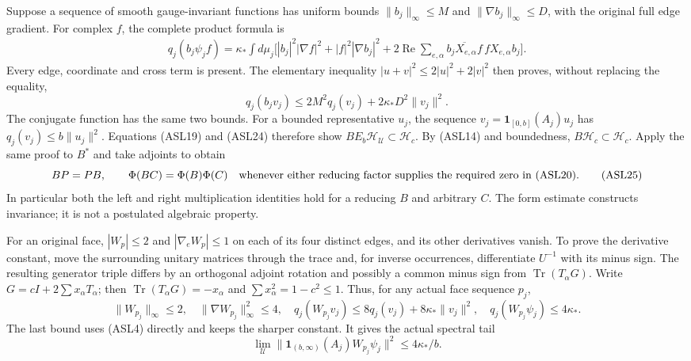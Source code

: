 \documentclass[11pt]{article}
\begin{document}
Suppose a sequence of smooth gauge-invariant functions has uniform bounds \(\|b_j\|_\infty\le M\) and \(\|\nabla b_j\|_\infty\le D\), with the original full edge gradient. For complex \(f\), the complete product formula is
\[
\begin{aligned}
 q_j(b_j\psi_jf)=\kappa_*\int d\mu_j\bigl[
 |b_j|^2|\nabla f|^2+|f|^2|\nabla b_j|^2
 +2\operatorname{Re}\sum_{e,\alpha}
    \overline{b_jX_{e,\alpha}f}\,fX_{e,\alpha}b_j\bigr].
\end{aligned}\tag{ASL23}
\]
Every edge, coordinate and cross term is present. The elementary inequality \(|u+v|^2\le2|u|^2+2|v|^2\) then proves, without replacing the equality,
\[
 q_j(b_jv_j)\le2M^2q_j(v_j)+2\kappa_*D^2\|v_j\|^2.
 \tag{ASL24}
\]
The conjugate function has the same two bounds. For a bounded representative \(u_j\), the sequence \(v_j=\mathbf1_{[0,b]}(A_j)u_j\) has \(q_j(v_j)\le b\|u_j\|^2\). Equations (ASL19) and (ASL24) therefore show \(BE_b\mathcal H_{\mathcal U}\subset\mathcal H_c\). By (ASL14) and boundedness, \(B\mathcal H_c\subset\mathcal H_c\). Apply the same proof to \(B^*\) and take adjoints to obtain
\[
 BP=PB,\qquad \Phi(BC)=\Phi(B)\Phi(C)
 \quad\hbox{whenever either reducing factor supplies the required zero in (ASL20).}
 \tag{ASL25}
\]
In particular both the left and right multiplication identities hold for a reducing \(B\) and arbitrary \(C\). The form estimate constructs invariance; it is not a postulated algebraic property.

For an original face, \(|W_p|\le2\) and \(|\nabla_eW_p|\le1\) on each of its four distinct edges, and its other derivatives vanish. To prove the derivative constant, move the surrounding unitary matrices through the trace and, for inverse occurrences, differentiate \(U^{-1}\) with its minus sign. The resulting generator triple differs by an orthogonal adjoint rotation and possibly a common minus sign from \(\operatorname{Tr}(T_\alpha G)\). Write \(G=cI+2\sum x_\alpha T_\alpha\); then \(\operatorname{Tr}(T_\alpha G)=-x_\alpha\) and \(\sum x_\alpha^2=1-c^2\le1\). Thus, for any actual face sequence \(p_j\),
\[
 \|W_{p_j}\|_\infty\le2,\quad
 \|\nabla W_{p_j}\|_\infty^2\le4,\quad
 q_j(W_{p_j}v_j)\le8q_j(v_j)+8\kappa_*\|v_j\|^2,
 \quad q_j(W_{p_j}\psi_j)\le4\kappa_*.
 \tag{ASL26}
\]
The last bound uses (ASL4) directly and keeps the sharper constant. It gives the actual spectral tail
\[
 \lim_{\mathcal U}\|\mathbf1_{(b,\infty)}(A_j)W_{p_j}\psi_j\|^2
 \le4\kappa_*/b.
 \tag{ASL27}
\]
\end{document}
